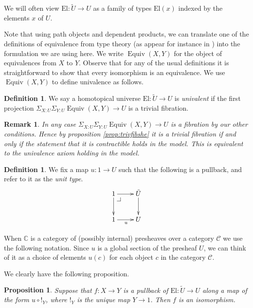 \documentclass[a4paper]{amsart}
\makeatletter
\newtheorem{proposition}[theorem]{Proposition}
\newtheorem{remark}[theorem]{Remark}
\theoremstyle{definition}
\newtheorem{definition}[theorem]{Definition}
\newcommand{\pullbackcorner}[1][dr]{\save*!/#1-1.2pc/#1:(-1,1)@^{|-}\restore}
\newcommand{\cat}[1]{\mathbb{#1}}
\newcommand{\catc}{\cat{C}}
\newcommand{\smcat}[1]{\mathcal{#1}}
\newcommand{\elu}{\mathrm{El}}
\newcommand{\hequiv}{\operatorname{Equiv}}
\makeatother
\begin{document}
We will often view $\elu \colon \tilde{U} \to U$ as a family of types
$\elu(x)$ indexed by the elements $x$ of $U$.

Note that using path objects and dependent products, we can translate
one of the definitions of equivalence from type theory (as appear for
instance in \cite[Chapter 4]{hottbook}) into the formulation we are
using here. We write $\hequiv(X, Y)$ for the object of equivalences
from $X$ to $Y$. Observe that for any of the usual definitions it is
straightforward to show that every isomorphism is an equivalence. We
use $\hequiv(X, Y)$ to define univalence as follows.
\begin{definition}
  We say a homotopical universe $\elu \colon \tilde{U} \to U$ is
  \emph{univalent} if the first projection
  $\Sigma_{X : U} \Sigma_{Y : U} \hequiv(X, Y) \to U$ is a trivial
  fibration.
\end{definition}

\begin{remark}
  In any case $\Sigma_{X : U} \Sigma_{Y : U} \hequiv(X, Y) \to U$ is a
  fibration by our other conditions. Hence by proposition
  \ref{prop:trivfibshe} it is a trivial fibration if and only if the
  statement that it is contractible holds in the model. This is
  equivalent to the univalence axiom holding in the model.
\end{remark}

\begin{definition}
  We fix a map $u \colon 1 \to U$ such that the following is a
  pullback, and refer to it as the \emph{unit type}.
  \begin{equation*}
    \xymatrix{ 1 \ar[r] \ar[d] \pullbackcorner & \tilde{U} \ar[d] \\
      1 \ar[r]_u & U}
  \end{equation*}

  When $\catc$ is a category of (possibly internal) presheaves over a
  category $\smcat{C}$ we use the following notation.
  Since $u$ is a global section of the presheaf $U$, we can think of
  it as a choice of elements $u(c)$ for each object $c$ in the
  category $\smcat{C}$.
\end{definition}

We clearly have the following proposition.
\begin{proposition}
  Suppose that $f \colon X \to Y$ is a pullback of $\elu \colon
  \tilde{U} \to U$ along a map of the form $u \circ !_Y$, where $!_Y$
  is the unique map $Y \to 1$. Then $f$ is an isomorphism.
\end{proposition}
\end{document}
